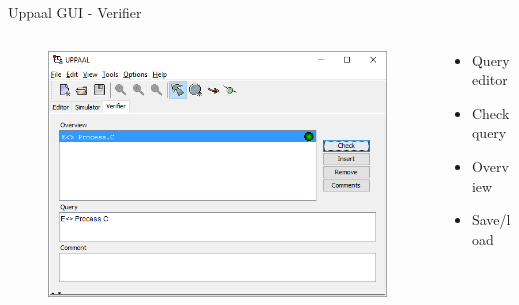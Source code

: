 \documentclass{beamer}
\begin{document}
\begin{frame}{Uppaal GUI - Verifier}
	\vspace{-5mm}
	\begin{columns}
		\begin{column}{0.8\textwidth}
			\begin{figure}[H]
				\includegraphics[scale=0.55]{img/uppaal_gui_small_verification.png}
			\end{figure}
		\end{column}
		
		\begin{column}{0.35\textwidth}
			\begin{itemize}
				\item Query editor
				\item Check query
				\item Overview
				\item Save/load
			\end{itemize}
		\end{column}
	\end{columns}		
\end{frame}

\end{document}
